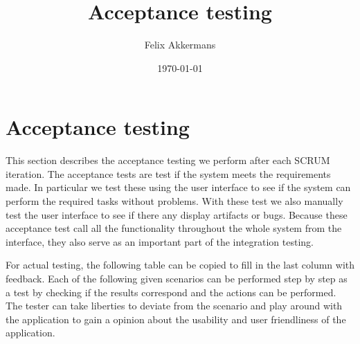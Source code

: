 \documentclass{article}
\newcounter{step}
\begin{document}
\title{Acceptance testing}
\author{Felix Akkermans}
\date{\today}
\maketitle



\section{Acceptance testing}
This section describes the acceptance testing we perform after each SCRUM iteration. The acceptance tests are test if the system meets the requirements made. In particular we test these using the user interface to see if the system can perform the required tasks without problems. With these test we also manually test the user interface to see if there any display artifacts or bugs. Because these acceptance test call all the functionality throughout the whole system from the interface, they also serve as an important part of the integration testing.

For actual testing, the following table can be copied to fill in the last column with feedback. Each of the following given scenarios can be performed step by step as a test by checking if the results correspond and the actions can be performed. The tester can take liberties to deviate from the scenario and play around with the application to gain a opinion about the usability and user friendliness of the application.
\end{document}
